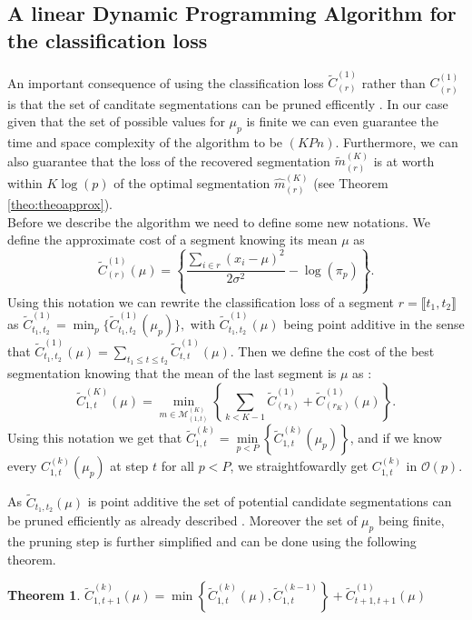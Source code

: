 \documentclass[article,10pt]{llncs}
\newtheorem{theo}{Theorem}[section]    %
\begin{document}
\subsection{A linear Dynamic Programming Algorithm for the classification loss}

An important consequence of using the classification loss $\widetilde{C}_{(r)}^{(1)}$ rather than ${C}_{(r)}^{(1)}$ is that the set of canditate segmentations 
can be pruned efficently \cite{rigaill_2010}. In our case given that the set of possible values for $\mu_p$ is finite we can even guarantee the time and space complexity of the algorithm to be $\mathcal{}(KPn)$. 
Furthermore, we can also guarantee that the loss of the recovered segmentation $\widetilde{m}_{(r)}^{(K)}$ is at worth within $K \log(p)$ of the optimal segmentation $\widehat{m}_{(r)}^{(K)}$ (see Theorem \ref{theo:theoapprox}). \\

Before we describe the algorithm we need to define some new notations. We define the approximate cost of a segment knowing its mean $\mu$ as 
$$ \widetilde{C}_{(r)}^{(1)}   (\mu) = \left\{ \frac{\sum_{i \in r} (x_i - \mu)^2  } {2 \sigma^2 } - \log(\pi_p) \right\}.$$
Using this notation we can rewrite the classification loss of a segment $r = \llbracket t_1, t_2 \rrbracket$ as $\widetilde{C}_{t_1, t_2}^{(1)}  = \min_p \{  \widetilde{C}_{t_1, t_2}^{(1)}  (\mu_p) \},$ with $\widetilde{C}_{t_1, t_2}^{(1)}  (\mu)$ being point additive in the sense that $\widetilde{C}_{t_1, t_2}^{(1)}  (\mu) = \underset{ t_1 \leq t \leq t_2}{\sum} \widetilde{C}_{t, t}^{(1)}  (\mu).$ Then we define the cost of the best segmentation knowing that the mean of the last segment is $\mu$ as :
$$\widetilde{C}_{1, t}^{(K)}(\mu) = \underset{{m \in \mathcal{M}^{(K)}_{(1, t)}}}{\min} \left\{ \sum_{k < K-1}  \widetilde{C}^{(1)}_{(r_k)}  + \widetilde{C}^{(1)}_{(r_K)}(\mu) \right\}.$$
Using this notation we get that $ \widetilde{C}_{1, t}^{(k)}  = \underset{p < P}{\min} \left\{ \widetilde{C}_{1, t}^{(k)}(\mu_p) \right\}$, and if we know every $C_{1, t}^{(k)}(\mu_p)$ at step $t$ for all $p< P$, we straightfowardly get $C_{1, t}^{(k)}$ in $\mathcal{O}(p)$.

As $\widetilde{C}_{t_1, t_2} (\mu)$ is point additive the set of potential candidate segmentations can be pruned efficiently as already described \cite{rigaill_2010}. Moreover the set of $\mu_p$ being finite, the 
pruning step is further simplified and can be done using the following theorem.

\begin{theo}
$ \widetilde{C}_{1, t+1}^{(k)}(\mu) = \min \left\{ \widetilde{C}_{1, t}^{(k)}(\mu),  \widetilde{C}_{1, t}^{(k-1)} \right\} +  \widetilde{C}_{t+1, t+1}^{(1)}(\mu) $
\end{theo}
\end{document}
